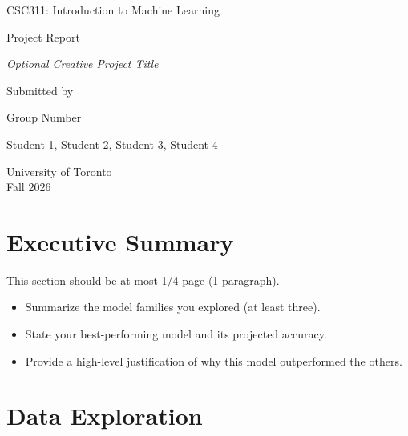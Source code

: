 \documentclass[12pt]{article}
\begin{document}
\begin{titlepage}
    \centering
    \vspace*{3cm}

    {\Large {CSC311: Introduction to Machine Learning} \par}
    \vspace{1cm}
    
    {\Large {Project Report} \par}
    \vspace{1cm}
    
    {\large \textit{Optional Creative Project Title} \par}
    \vspace{3cm}
    
    {\large Submitted by \par}
    
    \vspace{0.5cm}
    {\large Group Number}
    
    \vspace{0.5cm}
    {\large Student 1, Student 2, Student 3, Student 4 \par}
    
    \vfill
    {\large University of Toronto \\ Fall 2026 \par}
\end{titlepage}
\clearpage
\setcounter{page}{1}

\section{Executive Summary}

This section should be at most 1/4 page (1 paragraph).

\begin{itemize}
  \item Summarize the model families you explored (at least three).  
  \item State your best-performing model and its projected accuracy.  
  \item Provide a high-level justification of why this model outperformed the others.  
\end{itemize}

\section{Data Exploration}\label{sec:data-exploration}
\end{document}
